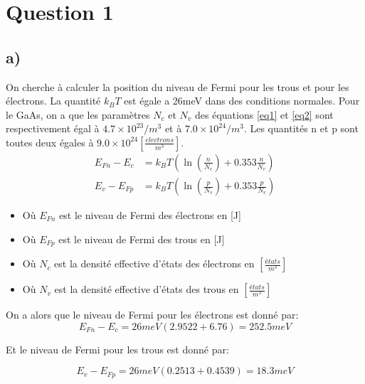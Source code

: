 



\label{s:experimentation}
\chapter{Question 1}
\section{a)}

On cherche à calculer la position du niveau de Fermi pour les trous et pour les électrons. La quantité $k_B T$ est égale a 26meV dans des conditions normales. Pour le GaAs, on a que les paramètres $N_c$ et $N_v$ des équations \ref{eq1} et \ref{eq2} sont respectivement égal à $4.7\times 10^{23}/m^3$ et à $7.0\times 10^{24}/m^3$. Les quantités n et p sont toutes deux égales à $9.0\times 10^{24}\left[\frac{electrons}{m^3}\right]$. 
\begin{align}
\label{eq1}
E_{Fn} - E_c &= k_B T\left(\ln\left(\frac{n}{N_c}\right) + 0.353 \frac{n}{N_c}\right)\\
\label{eq2}
E_{v} - E_{Fp} &= k_B T\left(\ln\left(\frac{p}{N_v}\right) + 0.353 \frac{p}{N_v}\right)
\end{align}
\begin{itemize}
\item Où $E_{Fn}$ est le niveau de Fermi des électrons en [J]
\item Où $E_{Fp}$ est le niveau de Fermi des trous en [J]
\item Où $N_c$ est la densité effective d'états des électrons en $\left[\frac{états}{m^3}\right]$
\item Où $N_v$ est la densité effective d'états des trous en $\left[\frac{états}{m^3}\right]$
\end{itemize}

On a alors que le niveau de Fermi pour les électrons est donné par:
\begin{equation}
E_{Fn} - E_c  = 26meV \left( 2.9522 + 6.76\right) = 252.5meV
\end{equation}

Et le niveau de Fermi pour les trous est donné par:

\begin{equation}
E_{v} - E_{Fp} = 26meV \left( 0.2513 + 0.4539 \right) =18.3meV
\end{equation}

